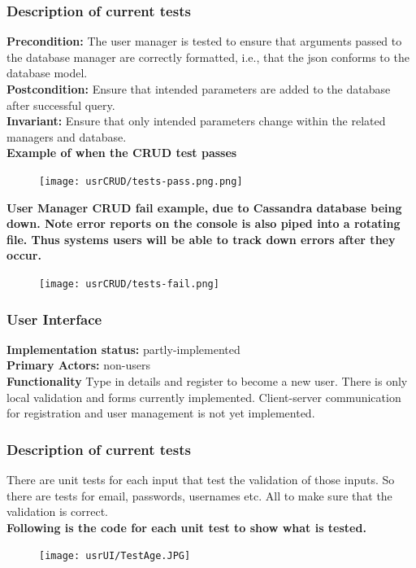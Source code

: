 \documentclass[12pt]{article}
\begin{document}
{	\subsubsection{Description of current tests}
	\textbf{Precondition:} The user manager is tested to ensure that arguments passed to the database manager are correctly formatted, i.e., that the json conforms to the database model. \\
	\textbf{Postcondition:} Ensure that intended parameters are added to the database after successful query. \\
	\textbf{Invariant:} Ensure that only intended parameters change within the related managers and database. \\
	\textbf{Example of when the CRUD test passes}
	\begin{center}
	\begin{figure}[h]
		\texttt{[image: usrCRUD/tests-pass.png.png]}
	\end{figure}
	\end{center}
	\textbf{User Manager CRUD fail example, due to Cassandra database being down. Note error reports on the console is also piped into a rotating file. Thus systems users will be able to track down errors after they occur.}
	\begin{center}
	\begin{figure}[h]
		\texttt{[image: usrCRUD/tests-fail.png]}
	\end{figure}
	\end{center}



	\subsubsection{User Interface}
	\textbf{Implementation status:} partly-implemented \\
	\textbf{Primary Actors:} non-users \\
	\textbf{Functionality} Type in details and register to become a new user. There is only local validation and forms currently implemented. Client-server communication for registration and user management is not yet implemented.
	\subsubsection{Description of current tests}
	There are unit tests for each input that test the validation of those inputs. So there are tests for email, passwords, usernames etc. All to make sure that the validation is correct. \\
	\textbf{Following is the code for each unit test to show what is tested.}
	\begin{center}
	\begin{figure}[h]
		\texttt{[image: usrUI/TestAge.JPG]}
	\end{figure}


\end{center}}
\end{document}
